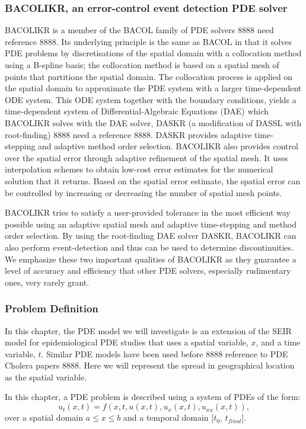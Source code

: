 \documentclass{article}
\begin{document}
\subsubsection{BACOLIKR, an error-control event detection PDE solver}
\label{subsection:pde_software}
BACOLIKR is a member of the BACOL family of PDE solvers 8888 need reference 8888. Its underlying principle is the same as BACOL in that it solves PDE problems  by discretisations of the spatial domain with a collocation method using a B-spline basis; the collocation method is based on a spatial mesh of points that partitions the spatial domain. The collocation process is applied on the spatial domain to approximate the PDE system with a larger time-dependent ODE system. This ODE system together with the boundary conditions, yields a time-dependent system of Differential-Algebraic Equations (DAE) which BACOLIKR solves with the DAE solver, DASKR (a modification of DASSL with root-finding) 8888 need a reference 8888. DASKR provides adaptive time-stepping and adaptive method order selection. BACOLIKR also provides control over the spatial error through adaptive refinement of the spatial mesh. It uses interpolation schemes to obtain low-cost error estimates for the numerical solution that it returns. Based on the spatial error estimate, the spatial error can be controlled by increasing or decreasing the number of spatial mesh points.

BACOLIKR tries to satisfy a user-provided tolerance in the most efficient way possible using an adaptive spatial mesh and adaptive time-stepping and method order selection. By using the root-finding DAE solver DASKR, BACOLIKR can also perform event-detection and thus can be used to determine discontinuities. We emphasize these two important qualities of BACOLIKR as they guarantee a level of accuracy and efficiency that other PDE solvers, especially rudimentary ones, very rarely grant.

\subsubsection{Problem Definition}
\label{subsection:pde_problem_def}
In this chapter, the PDE model we will investigate is an extension of the SEIR model for epidemiological PDE studies that uses a spatial variable, $x$, and a time variable, $t$. Similar PDE models have been used before 8888 reference to PDE Cholera papers 8888. Here we will represent the spread in geographical location as the spatial variable.

In this chapter, a PDE problem is described using a system of PDEs of the form:
\begin{equation}
u_t(x, t) = f(x, t, u(x,t), u_x(x,t), u_{xx}(x,t)),
\end{equation} 
over a spatial domain ${a \leq x \leq b}$ and a temporal domain [${t_0}$, $t_{final}$]. 
\end{document}
